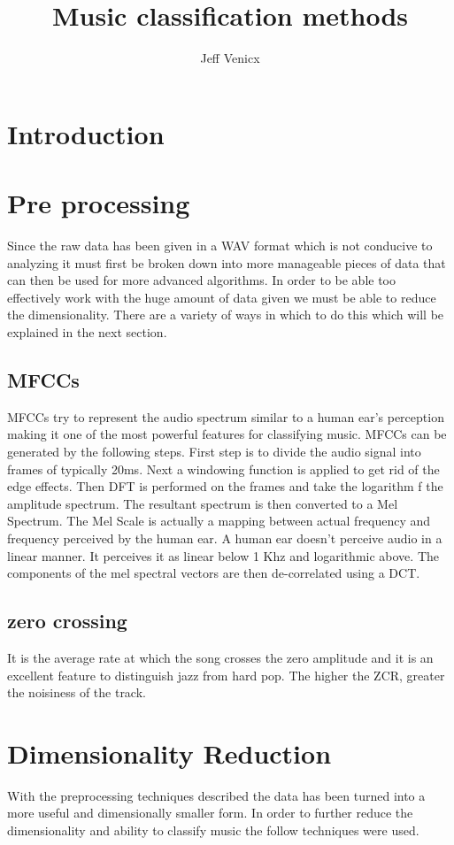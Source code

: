 \documentclass[12pt]{article}
\author{Jeff Venicx}
\title{Music classification methods}
\begin{document}
\maketitle
\newpage

\section{Introduction}
\section{Pre processing}
Since the raw data has been given in a WAV format which is not conducive to analyzing it must first be broken down into more manageable pieces of data that can then be used for more advanced algorithms.
In order to be able too effectively work with the huge amount of data given we must be able to reduce the dimensionality. There are a variety of ways in which to do this which will be explained in the next section.
\subsection{MFCCs}
MFCCs try to represent the audio spectrum similar to a human ear's perception making it one of the most powerful features for classifying music. MFCCs can be generated by the following steps. First step is to divide the audio signal into frames of typically 20ms. Next a windowing function is applied to get rid of the edge effects. Then DFT is performed on the frames and take the logarithm f the amplitude spectrum. The resultant spectrum is then converted to a Mel Spectrum.  The Mel Scale is actually a mapping between actual frequency and frequency perceived by the human ear. A human ear doesn't perceive audio in a linear manner. It perceives it as linear below 1 Khz and logarithmic above. The components of the mel spectral vectors are then de-correlated using a DCT. %
\subsection{zero crossing}
It is the average rate at which the song crosses the zero amplitude and it is an excellent feature to distinguish jazz from hard pop. The higher the ZCR, greater the noisiness of the track.
\section{Dimensionality Reduction}
 With the preprocessing techniques described the data has been turned into a more useful and dimensionally smaller form. In order to further reduce the dimensionality and ability to classify music the follow techniques were used. 
\end{document}
